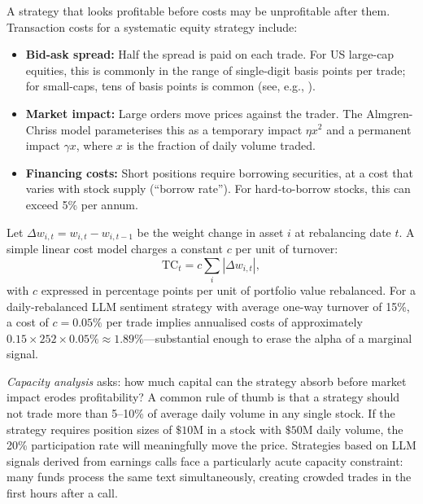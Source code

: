 A strategy that looks profitable before costs may be unprofitable after them. Transaction
costs for a systematic equity strategy include:
\begin{itemize}
  \item \textbf{Bid-ask spread:} Half the spread is paid on each trade. For US large-cap
    equities, this is commonly in the range of single-digit basis points per trade; for small-caps, tens of basis points is common (see, e.g., \citealt{grinold2000active}).
  \item \textbf{Market impact:} Large orders move prices against the trader. The
    Almgren-Chriss model \citep{almgren2001optimal} parameterises this as a temporary
    impact $\eta x^2$ and a permanent impact $\gamma x$, where $x$ is the fraction of
    daily volume traded.
  \item \textbf{Financing costs:} Short positions require borrowing securities, at a cost
    that varies with stock supply (``borrow rate''). For hard-to-borrow stocks, this can
    exceed 5\% per annum.
\end{itemize}

Let $\Delta w_{i,t} = w_{i,t} - w_{i,t-1}$ be the weight change in asset $i$ at
rebalancing date $t$. A simple linear cost model charges a constant $c$ per unit of
turnover:
\begin{equation}
  \text{TC}_t = c \sum_{i} |\Delta w_{i,t}|,
  \label{eq:ch10-transaction-cost}
\end{equation}
with $c$ expressed in percentage points per unit of portfolio value rebalanced. For a
daily-rebalanced LLM sentiment strategy with average one-way turnover of 15\%, a cost
of $c = 0.05\%$ per trade implies annualised costs of approximately $0.15 \times 252
\times 0.05\% \approx 1.89\%$---substantial enough to erase the alpha of a marginal
signal.

\emph{Capacity analysis} asks: how much capital can the strategy absorb before market
impact erodes profitability? A common rule of thumb is that a strategy should not trade
more than 5--10\% of average daily volume in any single stock. If the strategy requires
position sizes of $\$10$M in a stock with $\$50$M daily volume, the 20\% participation
rate will meaningfully move the price. Strategies based on LLM signals derived from
earnings calls face a particularly acute capacity constraint: many funds process the same
text simultaneously, creating crowded trades in the first hours after a call.

